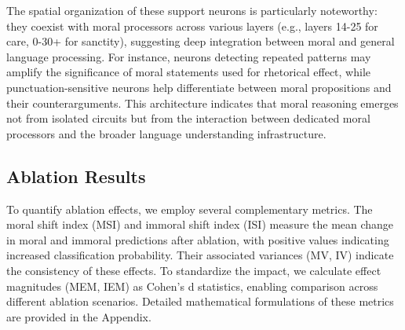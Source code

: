 \documentclass[runninghheads]{llncs}
\begin{document}
The spatial organization of these support neurons is particularly noteworthy: they coexist with moral processors across various layers (e.g., layers 14-25 for care, 0-30+ for sanctity), suggesting deep integration between moral and general language processing. For instance, neurons detecting repeated patterns may amplify the significance of moral statements used for rhetorical effect, while punctuation-sensitive neurons help differentiate between moral propositions and their counterarguments. This architecture indicates that moral reasoning emerges not from isolated circuits but from the interaction between dedicated moral processors and the broader language understanding infrastructure.










\subsection{Ablation Results}


To quantify ablation effects, we employ several complementary metrics. The moral shift index (MSI) and immoral shift index (ISI) measure the mean change in moral and immoral predictions after ablation, with positive values indicating increased classification probability. Their associated variances (MV, IV) indicate the consistency of these effects. To standardize the impact, we calculate effect magnitudes (MEM, IEM) as Cohen's d statistics, enabling comparison across different ablation scenarios. Detailed mathematical formulations of these metrics are provided in the Appendix.
\end{document}
